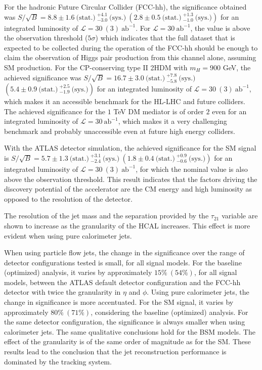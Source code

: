 For the hadronic Future Circular Collider (FCC-hh), the significance obtained was $S/\sqrt{B}= 8.8\pm 1.6~\text{(stat.)}~^{+4.1}_{-3.0}~\text{(sys.)}~\left(2.8\pm0.5~\text{(stat.)}~^{+1.3}_{-1.0}~\text{(sys.)}\right)$ for an integrated luminosity of $\mathcal{L}=30~(3)~\text{ab}^{-1}$. For $\mathcal{L}=30~\text{ab}^{-1}$, the value is above the observation threshold ($5\sigma$) which indicates that the full dataset that is expected to be collected during the operation of the FCC-hh should be enough to claim the observation of Higgs pair production from this channel alone, assuming SM production. For the CP-conserving type II 2HDM with $m_H=900$ GeV, the achieved significance was $S/\sqrt{B}=16.7\pm 3.0~\text{(stat.)}~^{+7.8}_{-5.8}~\text{(sys.)}$ $\left(5.4\pm0.9~\text{(stat.)}~^{+2.5}_{-1.9}~\text{(sys.)}\right)$ for an integrated luminosity of $\mathcal{L}=30~(3)~\text{ab}^{-1}$, which makes it an accessible benchmark for the HL-LHC and future colliders. The achieved significance for the $1$ TeV DM mediator is of order $2$ even for an integrated luminosity of $\mathcal{L}=30~\text{ab}^{-1}$, which makes it a very challenging benchmark and probably unaccessible even at future high energy colliders. 

With the ATLAS detector simulation, the achieved significance for the SM signal is $S/\sqrt{B}=5.7\pm 1.3~\text{(stat.)}~^{+3.1}_{-2.4}~\text{(sys.)} ~\left(1.8\pm 0.4~\text{(stat.)}~^{+0.9}_{-0.6}~\text{(sys.)}\right)$ for an integrated luminosity of $\mathcal{L}=30~(3)~\text{ab}^{-1}$, for which the nominal value is also above the observation threshold. This result indicates that the factors driving the discovery potential of the accelerator are the CM energy and high luminosity as opposed to the resolution of the detector.

The resolution of the jet mass and the separation provided by the $\tau_{21}$ variable are shown to increase as the granularity of the HCAL increases. This effect is more evident when using pure calorimeter jets. 

When using particle flow jets, the change in the significance over the range of detector configurations tested is small, for all signal models. For the baseline (optimized) analysis, it varies by approximately $15\%~(54\%)$, for all signal models, between the ATLAS default detector configuration and the FCC-hh detector with twice the granularity in $\eta$ and $\phi$. Using pure calorimeter jets, the change in significance is more accentuated. For the SM signal, it varies by approximately $80\%~(71\%)$, considering the baseline (optimized) analysis. For the same detector configuration, the significance is always smaller when using calorimeter jets. The same qualitative conclusions hold for the BSM models. The effect of the granularity is of the same order of magnitude as for the SM.
These results lead to the conclusion that the jet reconstruction performance is dominated by the tracking system. 

